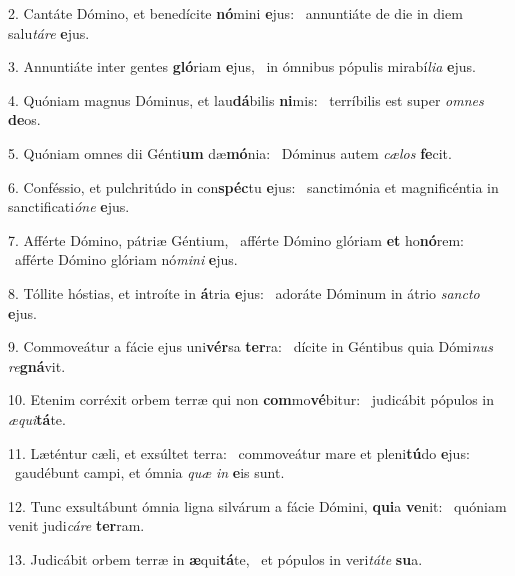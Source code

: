 2. Cantáte Dómino, et benedícite \textbf{nó}mini \textbf{e}jus: \ast\  annuntiáte de die in diem salu\textit{tá}\textit{re} \textbf{e}jus.\

3. Annuntiáte inter gentes \textbf{gló}riam \textbf{e}jus, \ast\  in ómnibus pópulis mirabí\textit{li}\textit{a} \textbf{e}jus.\

4. Quóniam magnus Dóminus, et lau\textbf{dá}bilis \textbf{ni}mis: \ast\  terríbilis est super \textit{om}\textit{nes} \textbf{de}os.\

5. Quóniam omnes dii Génti\textbf{um} dæ\textbf{mó}nia: \ast\  Dóminus autem \textit{cæ}\textit{los} \textbf{fe}cit.\

6. Conféssio, et pulchritúdo in con\textbf{spéc}tu \textbf{e}jus: \ast\  sanctimónia et magnificéntia in sanctificati\textit{ó}\textit{ne} \textbf{e}jus.\

7. Afférte Dómino, pátriæ Géntium, \dag\  afférte Dómino glóriam \textbf{et} ho\textbf{nó}rem: \ast\  afférte Dómino glóriam nó\textit{mi}\textit{ni} \textbf{e}jus.\

8. Tóllite hóstias, et introíte in \textbf{á}tria \textbf{e}jus: \ast\  adoráte Dóminum in átrio \textit{sanc}\textit{to} \textbf{e}jus.\

9. Commoveátur a fácie ejus uni\textbf{vér}sa \textbf{ter}ra: \ast\  dícite in Géntibus quia Dómi\textit{nus} \textit{re}\textbf{gná}vit.\

10. Etenim corréxit orbem terræ qui non \textbf{com}mo\textbf{vé}bitur: \ast\  judicábit pópulos in \textit{æ}\textit{qui}\textbf{tá}te.\

11. Læténtur cæli, et exsúltet terra: \dag\  commoveátur mare et pleni\textbf{tú}do \textbf{e}jus: \ast\  gaudébunt campi, et ómnia \textit{quæ} \textit{in} \textbf{e}is sunt.\

12. Tunc exsultábunt ómnia ligna silvárum a fácie Dómini, \textbf{qui}a \textbf{ve}nit: \ast\  quóniam venit judi\textit{cá}\textit{re} \textbf{ter}ram.\

13. Judicábit orbem terræ in \textbf{æ}qui\textbf{tá}te, \ast\  et pópulos in veri\textit{tá}\textit{te} \textbf{su}a.\

